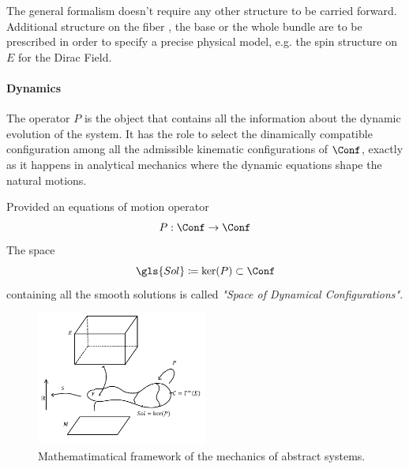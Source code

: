 \documentclass[Main]{subfiles}
\begin{document}
	\begin{observation}
	 	The general formalism doesn't require any other structure to be carried forward.
	 	Additional structure on the fiber , the base or the whole bundle are to be prescribed in order to specify a precise physical model, e.g. the spin structure on $E$ for the Dirac Field.\cite{Benini}
	 \end{observation}	
	
	\paragraph{Dynamics}
	The operator $P$ is the object that contains all the information about the dynamic evolution of the system.
	It has the role to select the dinamically compatible configuration among all the admissible kinematic configurations of $\Conf$, exactly as it happens in analytical mechanics where the dynamic equations shape the natural motions.
	\begin{notationfix}
		Provided an equations of motion operator
		\begin{displaymath}
			P: \Conf \rightarrow \Conf
		\end{displaymath}
		The space
		\begin{displaymath}
		\gls{Sol} \coloneqq \ker(P) \subset \Conf
		\end{displaymath}
		containing all the smooth solutions is called \emph{"Space of Dynamical Configurations"}.
	\end{notationfix}
	
	\begin{figure}[h!]
		\centering
		\includegraphics[width=0.5\textwidth]{Pictures/AbstractFieldTheory} 
		 	 	\caption{Mathematimatical framework of the mechanics of abstract systems. }
	\end{figure}	
	
\end{document}
